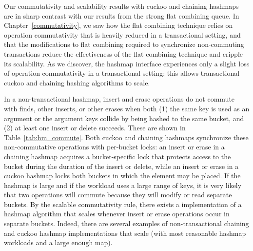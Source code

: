 Our commutativity and scalability results with cuckoo and chaining hashmaps are in sharp contrast with our results from the strong flat combining queue. In Chapter~\ref{commutativity}, we saw how the flat combining technique relies on operation commutativity that is heavily reduced in a transactional setting, and that the modifications to flat combining required to synchronize non-commuting transactions reduce the effectiveness of the flat combining technique and cripple its scalability. 
As we discover, the hashmap interface experiences only a slight loss of operation commutativity in a transactional setting; this allows transactional cuckoo and chaining hashing algorithms to scale.

In a non-transactional hashmap, insert and erase operations do not commute with finds, other inserts, or other erases when both (1) the same key is used as an argument or the argument keys collide by being hashed to the same bucket, and (2) at least one insert or delete succeeds.
    These are shown in Table~\ref{tab:hm_commute}. Both cuckoo and chaining hashmaps synchronize these non-commutative operations with per-bucket locks: an insert or erase in a chaining hashmap acquires a bucket-specific lock that protects access to the bucket during the duration of the insert or delete, while an insert or erase in a cuckoo hashmap locks both buckets in which the element may be placed. If the hashmap is large and if the workload uses a large range of keys, it is very likely that two operations will commute because they will modify or read separate buckets.
By the scalable commutativity rule, there exists a implementation of a hashmap algorithm that scales whenever insert or erase operations occur in separate buckets. Indeed, there are several examples of non-transactional chaining and cuckoo hashmap implementations that scale (with most reasonable hashmap workloads and a large enough map).

